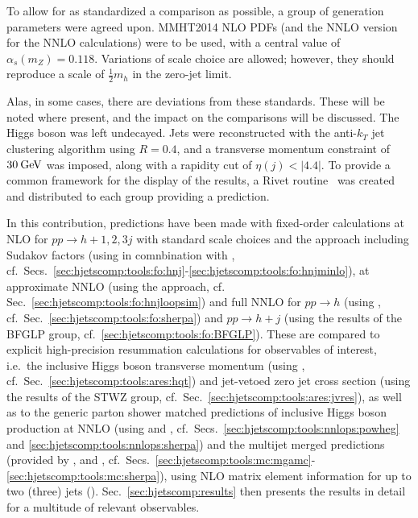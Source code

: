To allow for as standardized a comparison as possible, a group of
generation parameters were agreed upon. MMHT2014 NLO PDFs (and the
NNLO version for the NNLO calculations) were to be used, with a
central value of $\alpha_s(m_Z)=0.118$.  
Variations of scale choice are allowed; however, they
should reproduce a scale of $\tfrac{1}{2}m_h$ in the zero-jet limit.

Alas, in some cases, there are deviations from these standards. These
will be noted where present, and the impact on the comparisons will be
discussed.  The Higgs boson was left undecayed. Jets were reconstructed 
with the anti-$k_T$ jet clustering algorithm \cite{Cacciari:2008gp} using
$R=0.4$, and a transverse momentum constraint of $30\text{\:GeV}$ was imposed,
along with a rapidity cut of $\eta(j)<|4.4|$.  To provide a common
framework for the display of the results, a Rivet
routine~\cite{Buckley:2010ar,webpage} was created and distributed to each group
providing a prediction.

In this contribution, predictions have been made with fixed-order
calculations at NLO for $pp\to h+1,2,3j$ with standard scale choices 
and the \Minlo approach including Sudakov factors (using \GoSam in 
comnbination with \Sherpa, cf.\ Secs.\ 
\ref{sec:hjetscomp:tools:fo:hnj}-\ref{sec:hjetscomp:tools:fo:hnjminlo}), 
at approximate NNLO (using the \Loopsim approach, cf. Sec.\ 
\ref{sec:hjetscomp:tools:fo:hnjloopsim}) and full NNLO for $pp\to h$ 
(using \Sherpa, cf.\ Sec.\ \ref{sec:hjetscomp:tools:fo:sherpa}) and 
$pp\to h+j$ (using the results of the BFGLP group, cf.\ 
\ref{sec:hjetscomp:tools:fo:BFGLP}). These are compared to explicit 
high-precision resummation calculations for observables of interest, 
i.e.\ the inclusive Higgs boson transverse momentum (using \HqT, cf.\ 
Sec.\ \ref{sec:hjetscomp:tools:ares:hqt}) and jet-vetoed zero jet 
cross section (using the results of the STWZ group, cf.\ Sec.\ 
\ref{sec:hjetscomp:tools:ares:jvres}), as well as to the generic 
parton shower matched predictions of inclusive Higgs boson production 
at NNLO (using \Powheg and \Sherpa, cf.\ Secs.\ 
\ref{sec:hjetscomp:tools:nnlops:powheg} and 
\ref{sec:hjetscomp:tools:nnlops:sherpa}) and the multijet merged 
predictions (provided by \MGaMC, \Herwig and \Sherpa, cf.\ Secs.\ 
\ref{sec:hjetscomp:tools:mc:mgamc}-\ref{sec:hjetscomp:tools:mc:sherpa}), 
using NLO matrix element information for up to two (three) jets (\Sherpa). 
Sec.\ \ref{sec:hjetscomp:results} then presents the results in detail 
for a multitude of relevant observables.
